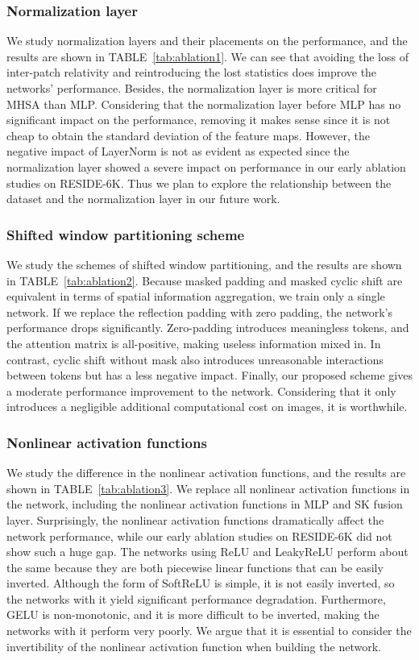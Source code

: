 \documentclass[journal]{IEEEtran}
\begin{document}
\subsubsection{Normalization layer}
We study normalization layers and their placements on the performance, and the results are shown in TABLE~\ref{tab:ablation1}.
We can see that avoiding the loss of inter-patch relativity and reintroducing the lost statistics does improve the networks' performance.
Besides, the normalization layer is more critical for MHSA than MLP. 
Considering that the normalization layer before MLP has no significant impact on the performance, removing it makes sense since it is not cheap to obtain the standard deviation of the feature maps.
However, the negative impact of LayerNorm is not as evident as expected since the normalization layer showed a severe impact on performance in our early ablation studies on RESIDE-6K.
Thus we plan to explore the relationship between the dataset and the normalization layer in our future work.

\subsubsection{Shifted window partitioning scheme}
We study the schemes of shifted window partitioning, and the results are shown in TABLE~\ref{tab:ablation2}.
Because masked padding and masked cyclic shift are equivalent in terms of spatial information aggregation, we train only a single network.
If we replace the reflection padding with zero padding, the network's performance drops significantly. 
Zero-padding introduces meaningless tokens, and the attention matrix is all-positive, making useless information mixed in.
In contrast, cyclic shift without mask also introduces unreasonable interactions between tokens but has a less negative impact.
Finally, our proposed scheme gives a moderate performance improvement to the network. 
Considering that it only introduces a negligible additional computational cost on  images, it is worthwhile.

\subsubsection{Nonlinear activation functions}
We study the difference in the nonlinear activation functions, and the results are shown in TABLE~\ref{tab:ablation3}.
We replace all nonlinear activation functions in the network, including the nonlinear activation functions in MLP and SK fusion layer.
Surprisingly, the nonlinear activation functions dramatically affect the network performance, while our early ablation studies on RESIDE-6K did not show such a huge gap.
The networks using ReLU and LeakyReLU perform about the same because they are both piecewise linear functions that can be easily inverted.
Although the form of SoftReLU is simple, it is not easily inverted, so the networks with it yield significant performance degradation.
Furthermore, GELU is non-monotonic, and it is more difficult to be inverted, making the networks with it perform very poorly.
We argue that it is essential to consider the invertibility of the nonlinear activation function when building the network.
\end{document}
